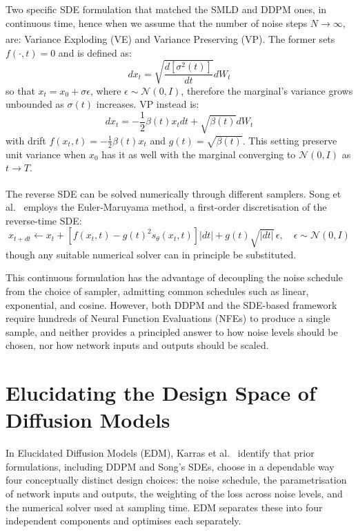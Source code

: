 Two specific SDE formulation that matched the SMLD and DDPM ones, in continuous time, hence when we assume that the number of noise steps \(N\xrightarrow[]{}\infty\), are: Variance Exploding (VE) and Variance Preserving (VP). The former sets \(f(\cdot,t)=0\) and is defined as:
\begin{equation}
    \label{eq:ve}
    dx_t=\sqrt{\frac{d[\sigma^2(t)]}{dt}}dW_t
\end{equation}
so that \(x_t=x_0+\sigma\epsilon\), where \(\epsilon\sim \mathcal{N}(0,I)\), therefore the marginal's variance grows unbounded as \(\sigma(t)\) increases. VP instead is:
$$dx_t=-\frac12 \beta(t)x_tdt+\sqrt{\beta(t)}dW_t$$
with drift \(f(x_t,t)=-\frac12\beta(t)x_t\) and \(g(t)=\sqrt{\beta(t)}\). This setting preserve unit variance when \(x_0\) has it as well with the marginal converging to \(\mathcal{N}(0,I)\) as \(t\xrightarrow[]{}T\).

The reverse SDE can be solved numerically through different samplers. 
Song et al.\ \cite{song2021score} employs the Euler-Maruyama method, a first-order 
discretisation of the reverse-time SDE:
\begin{equation}
\label{eq:euler_maruyama}
x_{t+dt} \leftarrow x_t + \left[f(x_t,t) - g(t)^2 s_\theta(x_t,t)\right]|dt| 
+ g(t)\sqrt{|dt|}\,\epsilon, \quad \epsilon \sim \mathcal{N}(0,I)
\end{equation}
though any suitable numerical solver can in principle be substituted.

This continuous formulation has the advantage of decoupling the noise schedule 
from the choice of sampler, admitting common schedules such as linear, 
exponential, and cosine. However, both DDPM \cite{ho2020ddpm} and the SDE-based 
framework \cite{song2021score} require hundreds of Neural Function 
Evaluations (NFEs) to produce a single sample, and neither provides a principled 
answer to how noise levels should be chosen, nor how network inputs and outputs 
should be scaled.

\section{Elucidating the Design Space of Diffusion Models}
\label{sec:edm_literature}
In Elucidated Diffusion Models (EDM), Karras et al.\ \cite{karras2022elucidating} identify that prior formulations, including 
DDPM and Song's SDEs, choose in a dependable way four conceptually distinct design choices: the noise schedule, the parametrisation of network inputs and outputs, the weighting 
of the loss across noise levels, and the numerical solver used at sampling time. 
EDM separates these into four independent components and optimises each 
separately.

